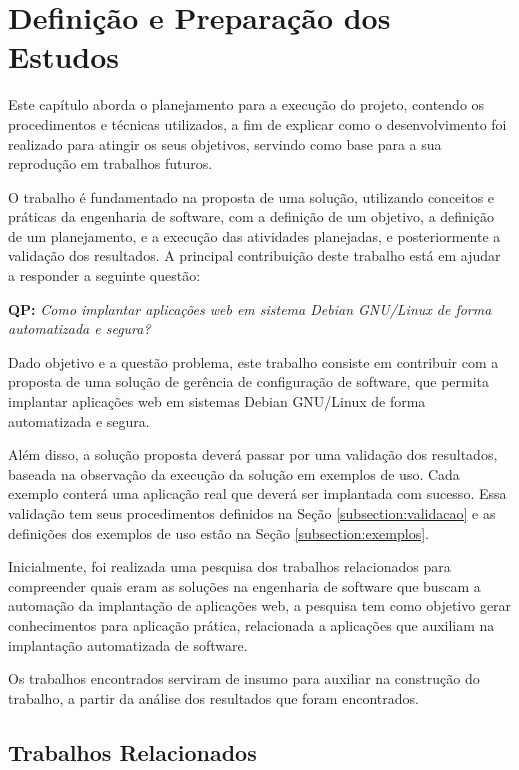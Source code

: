 \chapter{Definição e Preparação dos Estudos}

\label{cap-metodologia}
Este capítulo aborda o planejamento para a execução do projeto,
contendo os procedimentos e técnicas utilizados, a fim de
explicar como o desenvolvimento foi realizado para atingir os seus objetivos,
servindo como base para a sua reprodução em trabalhos futuros.

O trabalho é fundamentado na proposta de uma solução, utilizando conceitos e práticas
da engenharia de software, com a definição de um objetivo, a definição de um planejamento,
e a execução das atividades planejadas, e posteriormente a validação dos resultados. 
A principal contribuição deste trabalho está em ajudar a responder a seguinte questão:

\begin{center}
 \textbf{QP:}
  \textit{
  Como implantar aplicações web em sistema Debian GNU/Linux de forma automatizada e
  segura?
}
\end{center}

Dado objetivo e a questão problema, este trabalho consiste em contribuir
com a proposta de uma solução de gerência de configuração de software, que permita implantar
aplicações web em sistemas Debian GNU/Linux de forma automatizada e segura.

Além disso, a solução proposta deverá passar
por uma validação dos resultados, baseada na observação
da execução da solução em exemplos de uso. Cada exemplo conterá uma aplicação
real que deverá ser implantada com sucesso. Essa validação tem seus procedimentos
definidos na Seção \ref{subsection:validacao} e as definições dos exemplos de uso
estão na Seção \ref{subsection:exemplos}.

Inicialmente, foi realizada uma pesquisa dos trabalhos relacionados para compreender
quais eram as soluções na engenharia de software que buscam a automação da implantação
de aplicações web, a pesquisa tem como objetivo
gerar conhecimentos para aplicação prática,
relacionada a aplicações que auxiliam na implantação automatizada de software.

Os trabalhos encontrados serviram de insumo para auxiliar na construção do trabalho, 
a partir da análise dos resultados que foram encontrados. 

\section{Trabalhos Relacionados}
\label{section:trabalhos_relacionados}

